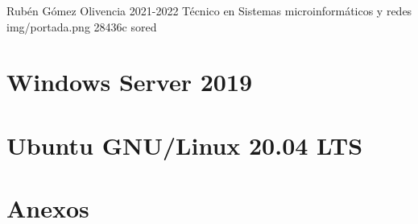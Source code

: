 \documentclass{\ClassPath/yukibook}
\begin{document}
  {Rubén Gómez Olivencia}  %
  {2021-2022}    %
  {Técnico en Sistemas microinformáticos y redes} %
  {} %
  {} %
  {img/portada.png} %
  {28436c}
  {sored} %

\coverpage
\graphicspath{{../../../yukibook.cls/}}
\licensepage

\tableofcontents

\part{Windows Server 2019}
\graphicspath{{../../../temas_comunes/windows_server/img/windows_server/}}


\part{Ubuntu GNU/Linux 20.04 LTS}
\graphicspath{{../../../temas_comunes/gnu_linux/img/}}






\part{Anexos}

\graphicspath{{../../../anexos/instalar_ubuntu_lts/img/}}


\graphicspath{{../../../anexos/ubuntu_raid1/img/}}


\graphicspath{{../../../anexos/gestion_backups/img/}}


\graphicspath{{../../../anexos/sistemas_monitorizacion/img/}}


\graphicspath{{../../../anexos/monitorizacion_munin/img/}}


\graphicspath{{../../../anexos/virtualbox_networking/img/}}


\graphicspath{{../../../anexos/}}

\end{document}
